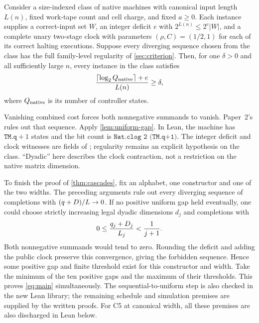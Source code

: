 \begin{corollary}
\label{cor:native-gap}
Consider a size-indexed class of native machines with canonical input
length $L(n)$, fixed work-tape count and cell charge, and fixed $a\ge0$.
Each instance supplies a correct-input set $W$, an integer deficit $e$
with $2^{L(n)}\le2^e|W|$, and a complete unary two-stage clock with
parameters $(\rho,C)=(1/2,1)$ for each of its correct halting executions.
Suppose every diverging sequence chosen from the class has the full
family-level regularity of \cref{sec:criterion}. Then, for one $\delta>0$
and all sufficiently large $n$, every instance in the class satisfies
\[
 \frac{\lceil\log_2 Q_{\rm native}\rceil+e}{L(n)}\ge\delta,
\]
where $Q_{\rm native}$ is its number of controller states.
\end{corollary}
\begin{outline}
Vanishing combined cost forces both nonnegative summands to vanish.
Paper~2's  rules out that sequence.
Apply \cref{lem:uniform-gap}. In Lean, the machine has
$\texttt{TM.q}+1$ states and the bit count is
$\texttt{Nat.clog 2 (TM.q+1)}$. The integer deficit and clock witnesses
are fields of ; regularity
remains an explicit hypothesis on the class. ``Dyadic'' here describes
the clock contraction, not a restriction on the native matrix dimension.
\end{outline}

\begin{informalproof}
To finish the proof of \cref{thm:cascades}, fix an alphabet, one constructor
and one of the two widths. The preceding arguments rule out every
diverging sequence of completions with $(q+D)/L\to0$.
If no positive uniform gap held eventually, one could choose strictly
increasing legal dyadic dimensions $d_j$ and completions with
\[
                       0\le\frac{q_j+D_j}{L_j}<\frac1{j+1}.
\]
Both nonnegative summands would tend to zero. Rounding the deficit and
adding the public clock preserve this convergence, giving the forbidden
sequence. Hence some positive gap and finite threshold exist for this
constructor and width. Take the minimum of the ten positive gaps and
the maximum of their thresholds. This proves \cref{eq:main} simultaneously.
The sequential-to-uniform step is also checked in the new Lean library;
the remaining schedule and simulation premises are supplied by the written
proofs. For C5 at canonical width, all these premises are also discharged
in Lean below.
\end{informalproof}

